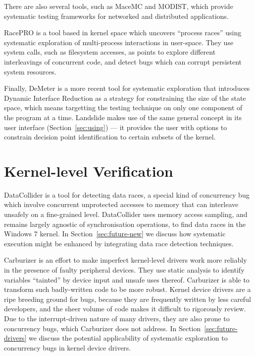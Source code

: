 There are also several tools, such as MaceMC\cite{macemc} and MODIST\cite{modist}, which provide systematic testing frameworks for networked and distributed applications.

RacePRO\cite{racepro} is a tool based in kernel space which uncovers ``process races''  using systematic exploration of multi-process interactions in user-space. They use system calls, such as filesystem accesses, as points to explore different interleavings of concurrent code, and detect bugs which can corrupt persistent system resources.

Finally, DeMeter\cite{demeter} is a more recent tool for systematic exploration that introduces Dynamic Interface Reduction as a strategy for constraining the size of the state space, which means targetting the testing technique on only one component of the program at a time. Landslide makes use of the same general concept in its user interface (Section~\ref{sec:using}) --- it provides the user with options to constrain decision point identification to certain subsets of the kernel.

\section{Kernel-level Verification}

DataCollider\cite{datacollider} is a tool for detecting data races, a special kind of concurrency bug which involve concurrent unprotected accesses to memory that can interleave unsafely on a fine-grained level.
DataCollider uses memory access sampling, and remains largely agnostic of synchronisation operations, to find data races in the Windows 7 kernel.
In Section~\ref{sec:future-new} we discuss how systematic execution might be enhanced by integrating data race detection techniques.

Carburizer\cite{carburizer} is an effort to make imperfect kernel-level drivers work more reliably in the presence of faulty peripheral devices. They use static analysis to identify variables ``tainted'' by device input and unsafe uses thereof. Carburizer is able to transform such badly-written code to be more robust.
Kernel device drivers are a ripe breeding ground for bugs, because they are frequently written by less careful developers, and the sheer volume of code makes it difficult to rigorously review.
Due to the interrupt-driven nature of many drivers, they are also prone to concurrency bugs, which Carburizer does not address.
In Section~\ref{sec:future-drivers} we discuss the potential applicability of systematic exploration to concurrency bugs in kernel device drivers.

